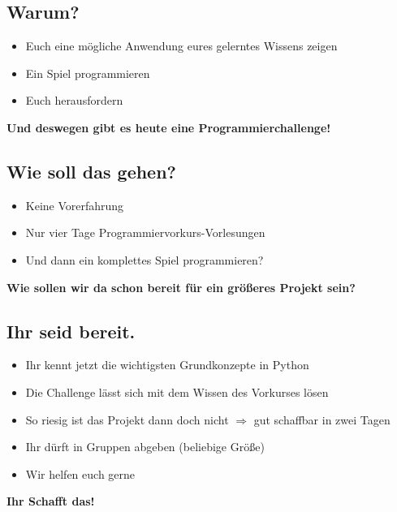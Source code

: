 \subsection{Warum?}
\begin{frame}
	\slidehead
	\pause
	\begin{itemize}
		\item Euch eine mögliche Anwendung eures gelerntes Wissens zeigen
		\item Ein Spiel programmieren
		\item Euch herausfordern
	\end{itemize}
	\pause
	\vspace{\fill}
	\begin{center}
		\textbf{\huge Und deswegen gibt es heute eine Programmierchallenge!}
	\end{center}
	\vspace{\fill}
\end{frame}

\subsection{Wie soll das gehen?}
\begin{frame}
	\slidehead
	\begin{itemize}
		\item Keine Vorerfahrung
		\item Nur vier Tage Programmiervorkurs-Vorlesungen
		\item Und dann ein komplettes Spiel programmieren?
	\end{itemize}
	\pause
	\vspace{\fill}
	\begin{center}
		\textbf{\huge Wie sollen wir da schon bereit für ein größeres Projekt sein?}
	\end{center}
	\vspace{\fill}
\end{frame}

\subsection{Ihr seid bereit.}
\begin{frame}
	\slidehead
	\begin{itemize}
		\item Ihr kennt jetzt die wichtigsten Grundkonzepte in Python
		\item Die Challenge lässt sich mit dem Wissen des Vorkurses lösen
		\item So riesig ist das Projekt dann doch nicht $\Rightarrow$ gut schaffbar in zwei Tagen
		\item Ihr dürft in Gruppen abgeben (beliebige Größe)
		\item Wir helfen euch gerne
	\end{itemize}
	\pause
	\vspace{\fill}
	\begin{center}
		\textbf{\huge Ihr Schafft das!}
	\end{center}
	\vspace{\fill}
\end{frame}

